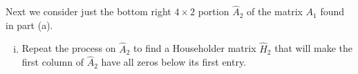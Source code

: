 \begin{pactivity}
\begin{comment}
\end{comment}

\item Next we consider just the bottom right $4 \times 2$ portion $\hat{A}_2$ of the matrix $A_1$ found in part (a). 
	\begin{enumerate}[i.]
	\item Repeat the process on $\hat{A}_2$ to find a Householder matrix $\hat{H}_2$ that will make the first column of $\hat{A}_2$ have all zeros below its first entry.  
	
\begin{comment}

\solution We have 
\[\hat{A}_2= \left[ \begin{array}{rr} 
-0.6364&1.0000 \\ 
-1.0909&0.0000\\ 
-0.6364&-1.0000\\ 
-1.0000&0.0000
\end{array} \right].\] 
 Let $\vx_2 =  \left[ \begin{array}{r} -0.6364\\-1.0909\\-0.6364\\-1.0000 \end{array} \right]$. Then $\sigma_2 = ||\vx_2|| = 1.7320$ and we let $\vv_2 = \vx_2 - \sigma_2 \ve_1 = \left[ \begin{array}{r} -2.3684\\-1.0909\\-0.6364\\-1.0000  \end{array} \right]$. From this we have the Householder matrix 
\[\hat{H}_2 = I_4 - 2\frac{\vv_2 \vv_2^{\tr}}{||\vv_2||^2}.\]
We then have 
\[\hat{H}_2\hat{A}_2 = \left[ \begin{array}{rr} 
1.7321&0.0000\\ 
 0.0000&-0.4606 \\
 0.0000&-1.2687\\ 
 0.0000&-0.4222
\end{array} \right].\]

\end{comment}


\end{enumerate}
\end{pactivity}
